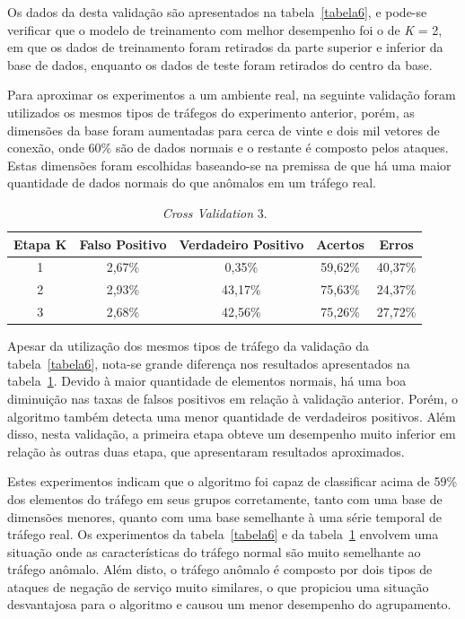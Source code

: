 \indent Os dados da desta validação são apresentados na tabela~\ref{tabela6}, e pode-se verificar que o modelo de treinamento com melhor desempenho foi o de \textit{K} = 2, em que os dados de treinamento foram retirados da parte superior e inferior da base de dados, enquanto os dados de teste foram retirados do centro da base.

\indent Para aproximar os experimentos a um ambiente real, na seguinte validação foram utilizados os mesmos tipos de tráfegos do experimento anterior, porém, as dimensões da base foram aumentadas  para cerca de vinte e dois mil vetores de conexão, onde 60\% são de dados normais e o restante é composto pelos ataques. Estas dimensões foram escolhidas baseando-se na premissa de que há uma maior quantidade de dados normais do que anômalos em um tráfego real.

\begin{table}[h]
\centering
\caption{\textit{Cross Validation} 3.}
\label{tabela7}
\vspace{0.5cm}
\begin{tabular}{|c|c|c|c|c|}
\hline
\textbf{Etapa K} & \textbf{Falso Positivo} & \textbf{Verdadeiro Positivo} & \textbf{Acertos} & \textbf{Erros}\\
\hline
1 & 2,67\% & 0,35\% & 59,62\% & 40,37\% \\
\hline
2 & 2,93\% & 43,17\% & 75,63\% & 24,37\%\\
\hline
3 & 2,68\% & 42,56\% & 75,26\% & 27,72\%\\
\hline
\end{tabular}
\end{table}

\indent Apesar da utilização dos mesmos tipos de tráfego da validação da tabela~\ref{tabela6}, nota-se grande diferença nos resultados apresentados na tabela~\ref{tabela7}. Devido à maior quantidade de elementos normais, há uma boa diminuição nas taxas de falsos positivos em relação à validação anterior. Porém, o algoritmo também detecta uma menor quantidade de verdadeiros positivos. Além disso, nesta validação, a primeira etapa obteve um desempenho muito inferior em relação às outras duas etapa, que apresentaram resultados aproximados.

\indent Estes experimentos indicam que o algoritmo foi capaz de classificar acima de 59\% dos elementos do tráfego em seus grupos corretamente, tanto com uma base de dimensões menores, quanto com uma base semelhante à uma série temporal de tráfego real. Os experimentos da tabela~\ref{tabela6} e da tabela~\ref{tabela7} envolvem uma situação onde as características do tráfego normal são muito semelhante ao tráfego anômalo. Além disto, o tráfego anômalo é composto por dois tipos de ataques de negação de serviço muito similares, o que propiciou uma situação desvantajosa para o algoritmo e causou um menor desempenho do agrupamento.
